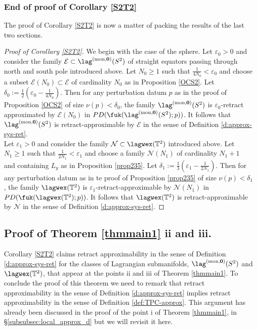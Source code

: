 

\subsubsection{End of proof of Corollary \ref{S2T2}}

The proof of Corollary \ref{S2T2} is now a matter of packing the results of the last two sections.
\begin{proof}[Proof of Corollary \ref{S2T2}]
	We begin with the case of the sphere. 
	Let $\varepsilon_0>0$ and consider the family $\mathcal{E}\subset \lag^{\text{(mon,} \mathbf{0} \text{)}}(S^2)$ of straight equators passing through north and south pole introduced above. Let $N_0\geq 1$ such that $\frac{1}{4N_0}<\varepsilon_0$ and choose a subset $\mathcal{E}(N_0)\subset \mathcal{E}$ of cardinality $N_0$ as in Proposition \ref{OCS2}. Let $\delta_0:=\frac{1}{2}\left(\varepsilon_0-\frac{1}{4N_0}\right)$. Then for any perturbation datum $p$ as in the proof of Proposition \ref{OCS2} of size $\nu(p)<\delta_0$, the family $\lag^{\text{(mon,} \mathbf{0} \text{)}}(S^2)$ is $\varepsilon_0$-retract approximated by $\mathcal{E}(N_0)$ in $PD(\fuk(\lag^{\text{(mon,} \mathbf{0} \text{)}}(S^2);p))$. It follows that $\lag^{\text{(mon,} \mathbf{0} \text{)}}(S^2)$ is retract-approximable by $\mathcal{E}$ in the sense of Definition \ref{d:approx-sys-ret}. 
	\\ Let $\varepsilon_1>0$ and consider the family $\mathcal{N}\subset\lagwex(\mathbb{T}^2)$ introduced above. Let $N_1\geq 1$ such that $\frac{1}{2N_1}<\varepsilon_1$ and  choose a family $\mathcal{N}(N_1)$ of cardinality $N_1+1$ and containing $L_y$ as in Proposition \ref{prop235}. Let $\delta_1:= \frac{1}{3}(\varepsilon_1-\frac{1}{2N_1})$. Then for any perturbation datum as in te proof of Proposition \ref{prop235} of size $\nu(p)<\delta_1$, the family $\lagwex(\mathbb{T}^2)$ is $\varepsilon_1$-retract-approximable by $\mathcal{N}(N_1)$ in $PD(\fuk(\lagwex(\mathbb{T}^2);p))$. It follows that $\lagwex(\mathbb{T}^2)$ is retract-approximable by $\mathcal{N}$ in the sense of Definition \ref{d:approx-sys-ret}. \end{proof}

\subsection{Proof of Theorem \ref{thmmain1} ii and iii.}\label{subsec:proof_ThmAii}
Corollary \ref{S2T2} claims retract approximability in the sense of Definition \ref{d:approx-sys-ret} for the classes of Lagrangian submanifolds, $\lag^{\text{(mon,} \mathbf{0} \text{)}}(S^2)$ and $\lagwex(\mathbb{T}^2)$, that appear at the points ii and iii of Theorem \ref{thmmain1}. To conclude the proof of this theorem we need to remark that retract approximability in the sense of  Definition \ref{d:approx-sys-ret} implies retract approximability in the sense of Definition \ref{def:TPC-approx}. This argument has already been discussed in the proof of the point i of Theorem \ref{thmmain1}, in \S\ref{subsubsec:local_approx_d} but we will revisit it here.

